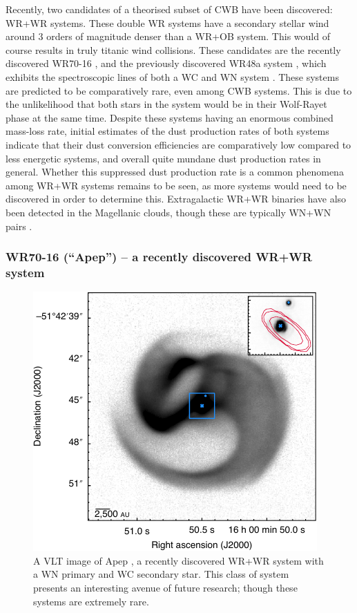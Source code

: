 Recently, two candidates of a theorised subset of CWB have been discovered: WR+WR systems.
These double WR systems have a secondary stellar wind around 3 orders of magnitude denser than a WR+OB system.
This would of course results in truly titanic wind collisions.
These candidates are the recently discovered WR70-16 \parencite{callinghamAnisotropicWindsWolf2019}, and the previously discovered WR48a system \parencite{danksInfraredSpectroscopyInfrared1983}, which exhibits the spectroscopic lines of both a WC and WN system \parencite{williamsVariableDustEmission2019}.
These systems are predicted to be comparatively rare, even among CWB systems.
This is due to the unlikelihood that both stars in the system would be in their Wolf-Rayet phase at the same time.
Despite these systems having an enormous combined mass-loss rate, initial estimates of the dust production rates of both systems indicate that their dust conversion efficiencies are comparatively low compared to less energetic systems, and overall quite mundane dust production rates in general.
Whether this suppressed dust production rate is a common phenomena among WR+WR systems remains to be seen, as more systems would need to be discovered in order to determine this.
Extragalactic WR+WR binaries have also been detected in the Magellanic clouds, though these are typically WN+WN pairs \parencite{shenarWolfRayetBinaries2019}.

\subsubsection{WR70-16 (``Apep'') -- a recently discovered WR+WR system}
\label{sec:bg-apep}

\begin{figure}[h]
  \centering
  \includegraphics[]{assets/systems/apep-callingham-2019.pdf}
  \caption[\textit{VLT image of Apep \parencite{callinghamAnisotropicWindsWolf2019}}]{A VLT image of Apep \parencite{callinghamAnisotropicWindsWolf2019}, a recently discovered WR+WR system with a WN primary and WC secondary star. This class of system presents an interesting avenue of future research; though these systems are extremely rare.}
  \label{fig:apep-callingham}
\end{figure}


